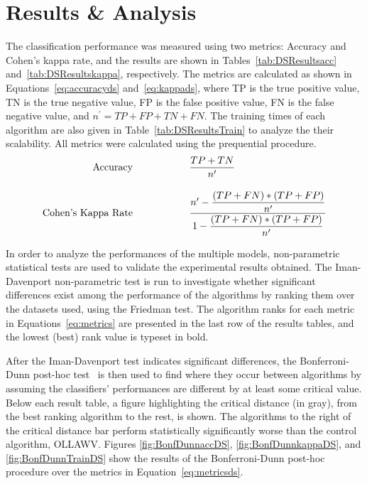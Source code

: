 \documentclass[reqno]{vcuthesis}
\newcommand\tab[1][1cm]{\hspace*{#1}}
\numberwithin{equation}{chapter}
\begin{document}
\section{Results \& Analysis}
The classification performance was measured using two metrics: Accuracy and Cohen's kappa rate, and the results are shown in Tables~\ref{tab:DSResultsacc} and~\ref{tab:DSResultskappa}, respectively. The metrics are calculated as shown in Equations~\ref{eq:accuracyds} and~\ref{eq:kappads}, where TP is the true positive value, TN is the true negative value, FP is the false positive value, FN is the false negative value, and $n^\prime = TP + FP + TN + FN$. The training times of each algorithm are also given in Table~\ref{tab:DSResultsTrain} to analyze the their scalability. All metrics were calculated using the prequential procedure. 
\begin{subequations}\vspace{-1.8em}
\label{eq:metricsds}
\begin{align}
\text{Accuracy} \tab \tab &\dfrac{TP+TN}{n^\prime} \label{eq:accuracyds}\\[10pt]
\text{Cohen's Kappa Rate} \tab \tab &\dfrac{n^\prime - \dfrac{(TP+FN)*(TP+FP)}{n^\prime}}{1 - \dfrac{(TP+FN)*(TP+FP)}{n^\prime}} \label{eq:kappads}
\end{align}
\end{subequations}

In order to analyze the performances of the multiple models, non-parametric statistical tests are used to validate the experimental results obtained. The Iman-Davenport non-parametric test is run to investigate whether significant differences exist among the performance of the algorithms by ranking them over the datasets used, using the Friedman test. The algorithm ranks for each metric in Equations~\eqref{eq:metrics} are presented in the last row of the results tables, and the lowest (best) rank value is typeset in bold. 

After the Iman-Davenport test indicates significant differences, the Bonferroni-Dunn post-hoc test~\cite{Dunn1961} is then used to find where they occur between algorithms by assuming the classifiers' performances are different by at least some critical value. Below each result table, a figure highlighting the critical distance (in gray), from the best ranking algorithm to the rest, is shown. The algorithms to the right of the critical distance bar perform statistically significantly worse than the control algorithm, OLLAWV. Figures \ref{fig:BonfDunnaccDS}, \ref{fig:BonfDunnkappaDS}, and \ref{fig:BonfDunnTrainDS} show the results of the Bonferroni-Dunn post-hoc procedure over the metrics in Equation~\eqref{eq:metricsds}.
\end{document}

